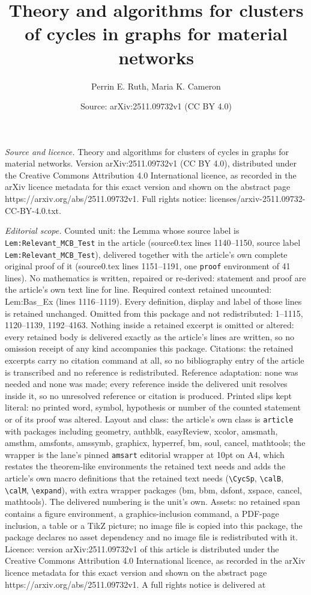 \documentclass[10pt,a4paper]{amsart}
\title[Theory and algorithms for clusters of cycles in graphs for m]{Theory and algorithms for clusters of cycles in graphs for material networks}
\author{Perrin E. Ruth, Maria K. Cameron}
\date{Source: arXiv:2511.09732v1 (CC BY 4.0)}
\begin{document}
\maketitle

\noindent\emph{Source and licence.} Theory and algorithms for clusters of cycles in graphs for material networks. Version arXiv:2511.09732v1 (CC BY 4.0), distributed under the Creative Commons Attribution 4.0 International licence, as recorded in the arXiv licence metadata for this exact version and shown on the abstract page https://arxiv.org/abs/2511.09732v1. Full rights notice: licenses/arxiv-2511.09732-CC-BY-4.0.txt.\par\smallskip

\noindent\textit{Editorial scope.} Counted unit: the Lemma whose source label is \texttt{Lem:Relevant\_MCB\_Test} in the article (source0.tex lines 1140--1150, source label \texttt{Lem:Relevant\_MCB\_Test}), delivered together with the article's own complete original proof of it (source0.tex lines 1151--1191, one \texttt{proof} environment of 41 lines). No mathematics is written, repaired or re-derived: statement and proof are the article's own text line for line. Required context retained uncounted: Lem:Bas\_Ex (lines 1116--1119). Every definition, display and label of those lines is retained unchanged. Omitted from this package and not redistributed: 1--1115, 1120--1139, 1192--4163. Nothing inside a retained excerpt is omitted or altered: every retained body is delivered exactly as the article's lines are written, so no omission receipt of any kind accompanies this package. Citations: the retained excerpts carry no citation command at all, so no bibliography entry of the article is transcribed and no reference is redistributed. Reference adaptation: none was needed and none was made; every reference inside the delivered unit resolves inside it, so no unresolved reference or citation is produced. Printed slips kept literal: no printed word, symbol, hypothesis or number of the counted statement or of its proof was altered. Layout and class: the article's own class is \texttt{article} with packages including geometry, authblk, easyReview, xcolor, amsmath, amsthm, amsfonts, amssymb, graphicx, hyperref, bm, soul, cancel, mathtools; the wrapper is the lane's pinned \texttt{amsart} editorial wrapper at 10pt on A4, which restates the theorem-like environments the retained text needs and adds the article's own macro definitions that the retained text needs (\texttt{\textbackslash CycSp}, \texttt{\textbackslash calB}, \texttt{\textbackslash calM}, \texttt{\textbackslash expand}), with extra wrapper packages (bm, bbm, dsfont, xspace, cancel, mathtools). The delivered numbering is the unit's own. Assets: no retained span contains a figure environment, a graphics-inclusion command, a PDF-page inclusion, a table or a TikZ picture; no image file is copied into this package, the package declares no asset dependency and no image file is redistributed with it. Licence: version arXiv:2511.09732v1 of this article is distributed under the Creative Commons Attribution 4.0 International licence, as recorded in the arXiv licence metadata for this exact version and shown on the abstract page https://arxiv.org/abs/2511.09732v1. A full rights notice is delivered at 
\end{document}
